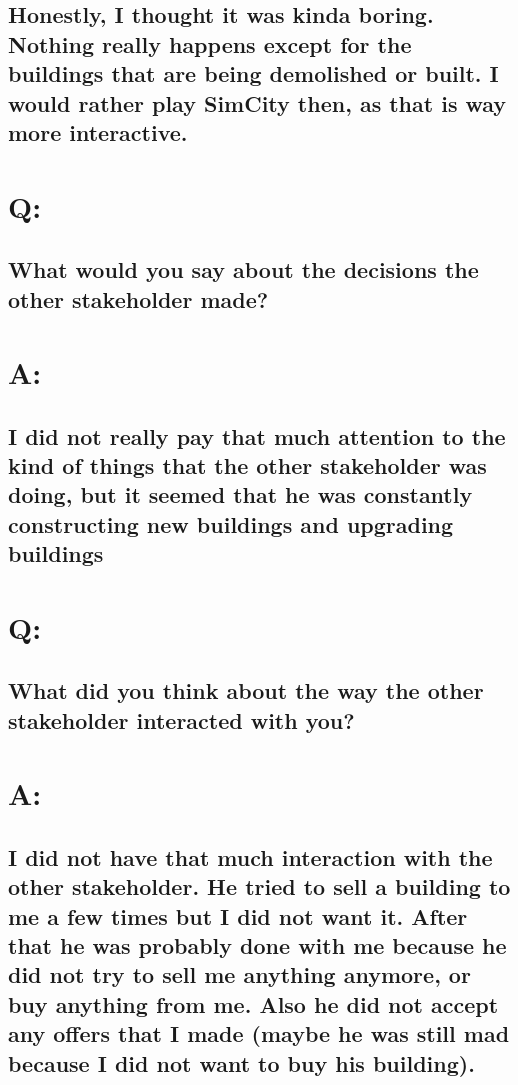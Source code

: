 \subsection*{Honestly, I thought it was kinda boring. Nothing really happens except for the buildings that are being demolished or built. I would rather play SimCity then, as that is way more interactive.}

\section*{Q:} 
\subsection*{What would you say about the decisions the other stakeholder made?}

\section*{A:}
\subsection*{I did not really pay that much attention to the kind of things that the other stakeholder was doing, but it seemed that he was constantly constructing new buildings and upgrading buildings}

\section*{Q:}
\subsection*{What did you think about the way the other stakeholder interacted with you?}

\section*{A:}
\subsection*{I did not have that much interaction with the other stakeholder. He tried to sell a building to me a few times but I did not want it. After that he was probably done with me because he did not try to sell me anything anymore, or buy anything from me. Also he did not accept any offers that I made (maybe he was still mad because I did not want to buy his building).}


